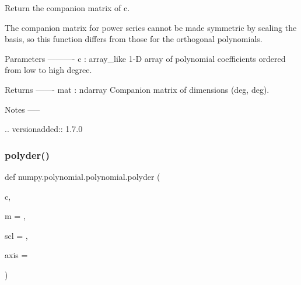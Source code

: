 \begin{DoxyVerb}Return the companion matrix of c.

The companion matrix for power series cannot be made symmetric by
scaling the basis, so this function differs from those for the
orthogonal polynomials.

Parameters
----------
c : array_like
    1-D array of polynomial coefficients ordered from low to high
    degree.

Returns
-------
mat : ndarray
    Companion matrix of dimensions (deg, deg).

Notes
-----

.. versionadded:: 1.7.0\end{DoxyVerb}
 \mbox{\label{namespacenumpy_1_1polynomial_1_1polynomial_a8d904fa6d68aa365f369e8aca05915f1}} 
\subsubsection{\texorpdfstring{polyder()}{polyder()}}
{\footnotesize\ttfamily def numpy.\+polynomial.\+polynomial.\+polyder (\begin{DoxyParamCaption}\item[{}]{c,  }\item[{}]{m = {},  }\item[{}]{scl = {},  }\item[{}]{axis = {} }\end{DoxyParamCaption})}

